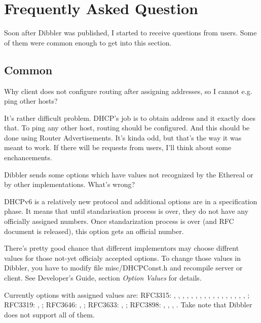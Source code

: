 

\section{Frequently Asked Question}

Soon after Dibbler was published, I started to receive questions from
users. Some of them were common enough to get into this section.

\subsection{Common}

\Q Why client does not configure routing after assigning addresses, so
I cannot e.g. ping other hosts?

\A It's rather difficult problem. DHCP's job is to obtain address and
it exactly does that. To ping any other host, routing should be 
configured. And this should be done using Router Advertisements. It's
kinda odd, but that's the way it was meant to work. If there will be
requests from users, I'll think about some enchancements.

\Q Dibbler sends some options which have values not recognized by the
Ethereal or by other implementations. What's wrong?

\A DHCPv6 is a relatively new protocol and additional options are in a
specification phase. It means that until standarisation process is
over, they do not have any officially assigned numbers. Once
standarization process is over (and RFC document is released), this
option gets an official number. 

There's pretty good chance that different implementors may choose
diffrent values for those not-yet officialy accepted options. To
change those values in Dibbler, you have to modify file
misc/DHCPConst.h and recompile server or client. See Developer's
Guide, section \emph{Option Values} for details.

Currently options with assigned values are: RFC3315: ,
, , , ,
, , ,
, , , ,
, , ,
, , ; RFC3319:
, ; RFC3646: ,
; RFC3633: , ; RFC3898:
, , ,
. Take note that Dibbler does not support all of
them.

